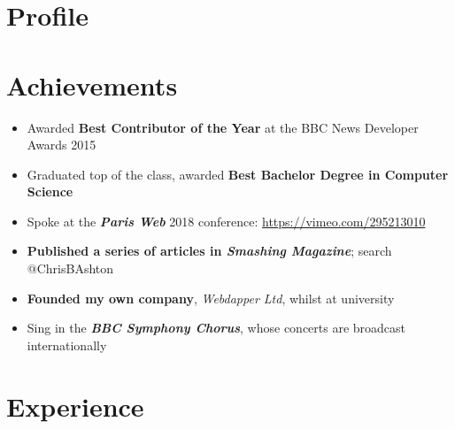 \documentclass[letterpaper]{twentysecondcv} %
\begin{document}
\makeprofile %

\section{Profile}
\cvsummary

\section{Achievements}
\begin{itemize}
    \item Awarded \textbf{Best Contributor of the Year} at the BBC News Developer Awards 2015

    \item Graduated top of the class, awarded \textbf{Best Bachelor Degree in Computer Science}

    \item Spoke at the \textbf{\emph{Paris Web}} 2018 conference: \url{https://vimeo.com/295213010}

    \item \textbf{Published a series of articles in \emph{Smashing Magazine}}; search @ChrisBAshton

    \item \textbf{Founded my own company}, \emph{Webdapper Ltd}, whilst at university

    \item Sing in the \textbf{\emph{BBC Symphony Chorus}}, whose concerts are broadcast internationally
\end{itemize}


\section{Experience}
\end{document}
